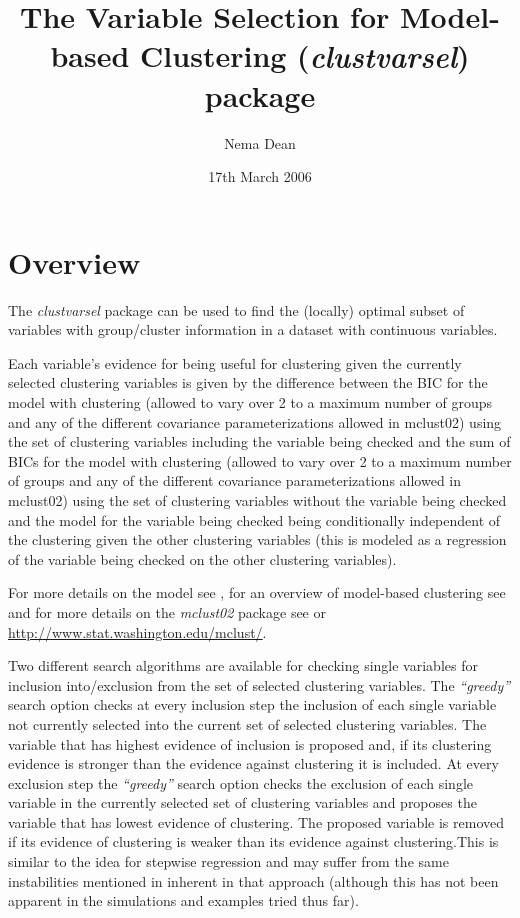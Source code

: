 \documentclass[,12pt]{article}
\newcommand{\Rpackage}[1]{{\textit{#1}}}
\newcommand{\Rfunarg}[1]{{\textit{#1}}}
\begin{document}
\title{The Variable Selection for Model-based Clustering (\Rpackage{clustvarsel}) package}
\author{Nema Dean}
\date{17th March 2006}
\maketitle
\tableofcontents

\section{Overview} 

The \Rpackage{clustvarsel} package can be used to find the (locally) optimal subset of variables with group/cluster information in a dataset with continuous variables. 

Each variable's evidence for being useful for clustering given the currently selected clustering variables is given by the difference between the BIC for the model with clustering (allowed to vary over 2 to a maximum number of groups and any of the different covariance parameterizations allowed in mclust02) using the set of clustering variables including the variable being checked and the sum of BICs for the model with clustering (allowed to vary over 2 to a maximum number of groups and any of the different covariance parameterizations allowed in mclust02) using the set of clustering variables without the variable being checked and the model for the variable being checked being conditionally independent of the clustering given the other clustering variables (this is modeled as a regression of the variable being checked on the other clustering variables).  

For more details on the model see , for an overview of model-based clustering see  and for more details on the \Rpackage{mclust02} package see  or \url{http://www.stat.washington.edu/mclust/}.

Two different search algorithms are available for checking single variables for inclusion into/exclusion from the set of selected clustering variables. The \Rfunarg{``greedy''} search option checks at every inclusion step the inclusion of each single variable not currently selected into the current set of selected clustering variables. The variable that has highest evidence of inclusion is proposed and, if its clustering evidence is stronger than the evidence against clustering it is included. At every exclusion step  the \Rfunarg{``greedy''} search option checks the exclusion of each single variable in the currently selected set of clustering variables and proposes the variable that has lowest evidence of clustering. The proposed variable is removed if its evidence of clustering is weaker than its evidence against clustering.This is similar to the idea for stepwise regression and may suffer from the same instabilities mentioned in  inherent in that approach (although this has not been apparent in the simulations and examples tried thus far).
\end{document}
